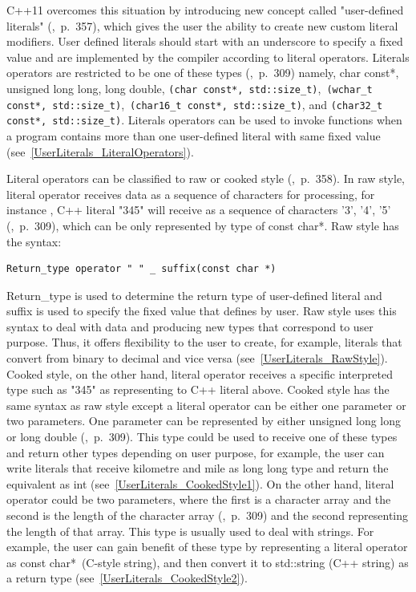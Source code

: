 \documentclass[11pt]{report}
\begin{document}
C++11 overcomes this situation by introducing new concept called "user-defined literals" (\cite{Overland:2011:CWF},~p.~357), which gives the user the ability to create new custom literal modifiers. User defined literals should start with an underscore to specify a fixed value and are implemented by the compiler according to literal operators. Literals operators are restricted to be one of these types (\cite{Gregorie:professionalcpp},~p.~309) namely, char const*, unsigned long long, long double, \texttt{(char const*, std::size\_t)},~\texttt{(wchar\_t const*, std::size\_t)},~\texttt{(char16\_t const*, std::size\_t)}, and \texttt{(char32\_t const*, std::size\_t)}. Literals operators can be used to invoke functions when a program contains more than one user-defined literal with same fixed value (see~\ref{UserLiterals_LiteralOperators}).

Literal operators can be classified to raw or cooked style (\cite{Overland:2011:CWF},~p.~358). In raw style, literal operator receives data as a sequence of characters for processing, for instance , C++ literal "345" will receive as a sequence of characters '3', '4', '5' (\cite{Gregorie:professionalcpp},~p.~309), which can be only represented by type of  const char*. Raw style has the syntax:
\begin{lstlisting}
Return_type operator " " _ suffix(const char *)
\end{lstlisting}

Return\_type is used to determine the return type of user-defined literal and suffix is used to specify the fixed value that defines by user. Raw style uses this syntax to deal with data and producing new types that correspond to user purpose. Thus, it offers flexibility to the user to create, for example, literals that convert from binary to decimal and vice versa (see~\ref{UserLiterals_RawStyle}). Cooked style, on the other hand, literal operator receives a specific interpreted type such as "345" as representing to C++ literal above. Cooked style has the same syntax as raw style except a literal operator can be either one parameter or two parameters. One parameter can be represented by either unsigned long long or long double (\cite{Gregorie:professionalcpp},~p.~309). This type could be used to receive one of these types and return other types depending on user purpose, for example, the user can write literals that receive kilometre and mile as long long type and return the equivalent as int (see~\ref{UserLiterals_CookedStyle1}). On the other hand, literal operator could be two parameters, where the first is a character array and the second is the length of the character array (\cite{Gregorie:professionalcpp},~p.~309) and the second representing the length of that array. This type is usually used to deal with strings. For example, the user can gain benefit of these type by representing a literal operator as const char*~(C-style string), and then convert it to std::string (C++ string) as a return type (see~\ref{UserLiterals_CookedStyle2}).
\end{document}
